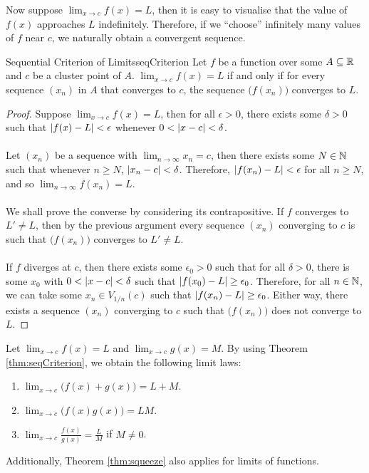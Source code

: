 \documentclass[math]{amznotes}
\theoremstyle{remark}
\begin{document}
Now suppose $\lim_{x \to c}f(x) = L$, then it is easy to visualise that the value of $f(x)$ approaches $L$ indefinitely. Therefore, if we ``choose'' infinitely many values of $f$ near $c$, we naturally obtain a convergent sequence.
\begin{thmbox}{Sequential Criterion of Limits}{seqCriterion}
    Let $f$ be a function over some $A \subseteq \mathbb{R}$ and $c$ be a cluster point of $A$. $\lim_{x \to c}f(x) = L$ if and only if for every sequence $(x_n)$ in $A$ that converges to $c$, the sequence $\bigl(f(x_n)\bigr)$ converges to $L$.
    \tcblower
    \begin{proof}
        Suppose $\lim_{x \to c}f(x) = L$, then for all $\epsilon > 0$, there exists some $\delta > 0$ such that ${\left\lvert {f(x) - L} \right\rvert} < \epsilon$ whenever $0 < {\left\lvert {x - c} \right\rvert} < \delta$.
        \\\\
        Let $(x_n)$ be a sequence with $\lim_{n \to \infty}x_n = c$, then there exists some $N \in \mathbb{N}$ such that whenever $n \geq N$, ${\left\lvert {x_n - c} \right\rvert} < \delta$. Therefore, ${\left\lvert {f(x_n) - L} \right\rvert} < \epsilon$ for all $n \geq N$, and so $\lim_{n \to \infty}f(x_n) = L$.
        \\\\
        We shall prove the converse by considering its contrapositive. If $f$ converges to $L' \neq L$, then by the previous argument every sequence $(x_n)$ converging to $c$ is such that $\bigl(f(x_n)\bigr)$ converges to $L' \neq L$. 
        \\\\
        If $f$ diverges at $c$, then there exists some $\epsilon_0 > 0$ such that for all $\delta > 0$, there is some $x_0$ with $0 < {\left\lvert {x - c} \right\rvert} < \delta$ such that ${\left\lvert {f(x_0) - L} \right\rvert} \geq \epsilon_0$. Therefore, for all $n \in \mathbb{N}$, we can take some $x_n \in V_{1 / n}(c)$ such that ${\left\lvert {f(x_n) - L} \right\rvert} \geq \epsilon_0$. Either way, there exists a sequence $(x_n)$ converging to $c$ such that $\bigl(f(x_n)\bigr)$ does not converge to $L$.
    \end{proof}
\end{thmbox}
Let $\lim_{x \to c}f(x) = L$ and $\lim_{x \to c}g(x) = M$. By using Theorem \ref{thm:seqCriterion}, we obtain the following limit laws:
\begin{enumerate}
    \item $\lim_{x \to c}\bigl(f(x) + g(x)\bigr) = L + M$.
    \item $\lim_{x \to c}\bigl(f(x)g(x)\bigr) = LM$.
    \item $\lim_{x \to c}\frac{f(x)}{g(x)} = \frac{L}{M}$ if $M \neq 0$.
\end{enumerate}
Additionally, Theorem \ref{thm:squeeze} also applies for limits of functions.
\end{document}
